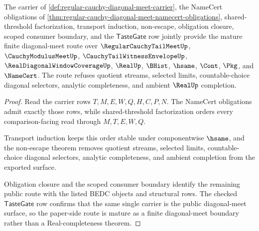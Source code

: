 \begin{theorem}
\label{thm:regular-cauchy-diagonal-meet-mature-route}
The carrier of \autoref{def:regular-cauchy-diagonal-meet-carrier}, the NameCert obligations of \autoref{thm:regular-cauchy-diagonal-meet-namecert-obligations}, shared-threshold factorization, transport induction, non-escape, obligation closure, scoped consumer boundary, and the $\mathsf{TasteGate}$ row jointly provide the mature finite diagonal-meet route over $\RegularCauchyTailMeetUp$, $\CauchyModulusMeetUp$, $\CauchyTailWitnessEnvelopeUp$, $\RealDiagonalWindowCoverageUp$, $\RealUp$, $\BHist$, $\hsame$, $\Cont$, $\Pkg$, and $\NameCert$. The route refuses quotient streams, selected limits, countable-choice diagonal selectors, analytic completeness, and ambient $\RealUp$ completion.
\end{theorem}
\begin{proof}
Read the carrier rows $T,M,E,W,Q,H,C,P,N$. The NameCert obligations admit exactly those rows, while shared-threshold factorization orders every comparison-facing read through $M,T,E,W,Q$.

Transport induction keeps this order stable under componentwise $\hsame$, and the non-escape theorem removes quotient streams, selected limits, countable-choice diagonal selectors, analytic completeness, and ambient completion from the exported surface.

Obligation closure and the scoped consumer boundary identify the remaining public route with the listed BEDC objects and structural rows. The checked $\mathsf{TasteGate}$ row confirms that the same single carrier is the public diagonal-meet surface, so the paper-side route is mature as a finite diagonal-meet boundary rather than a Real-completeness theorem.
\end{proof}

